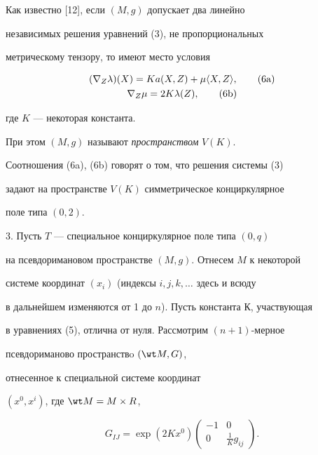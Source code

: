 \begin{exam}


Как известно [12], если $(M, g)$ допускает два линейно 


независимых решения уравнений (3), не пропорциональных


метрическому тензору, то имеют место условия 


\begin{gather}


(\nabla_{Z} \lambda)(X)= K a(X,Z) + \mu \la X,Z \ra, \tag{6a}\\


\nabla_{Z} \mu = 2K \lambda (Z), \tag{6b}


\end{gather}


где $K$ --- некоторая константа. 


При этом $(M, g)$ называют {\it пространством} $V(K)$. 


Соотношения (6a), (6b) говорят о том, что решения системы (3)


задают на пространстве $V(K)$ симметрическое конциркулярное 


поле типа $(0, 2)$.


\end{exam}


\addtocounter{equation}{1}





3. Пусть $T$ --- специальное конциркулярное поле типа $(0, q)$


на псевдоримановом пространстве $(M,g)$. Отнесем $M$ к некоторой 


системе координат $(x_{i})$ (индексы $i,j,k,\dotsc$ здесь и всюду


в дальнейшем изменяются от 1 до $n$). Пусть константа $К$, участвующая 


в уравнениях (5), отлична от нуля. Рассмотрим $(n+1)$-мерное 


псевдориманово пространствo $(\wt M, G)$,


отнесенное к специальной системе координат


$(x^0, x^i) $, где $\wt M = M \times R$,


\begin{equation}


G_{IJ}=\exp (2Kx^{0})


\begin{pmatrix} -1 & 0 \\ 0 & \frac {1} {K} g_{ij}


\end{pmatrix}


.


\end{equation}


